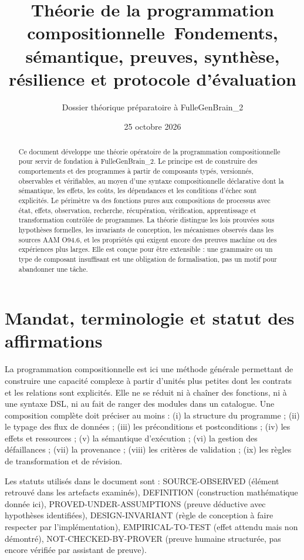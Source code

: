 \documentclass[11pt,a4paper]{article}
\title{Théorie de la programmation compositionnelle\
\large Fondements, sémantique, preuves, synthèse, résilience et protocole d'évaluation}
\author{Dossier théorique préparatoire à FulleGenBrain\_2}
\date{25 octobre 2026}
\newcommand{\kw}[1]{\textsf{#1}}
\theoremstyle{definition}
\theoremstyle{plain}
\theoremstyle{remark}
\begin{document}
\maketitle
\begin{abstract}
Ce document développe une théorie opératoire de la programmation compositionnelle pour servir de fondation à FulleGenBrain\_2. Le principe est de construire des comportements et des programmes à partir de composants typés, versionnés, observables et vérifiables, au moyen d'une syntaxe compositionnelle déclarative dont la sémantique, les effets, les coûts, les dépendances et les conditions d'échec sont explicités. Le périmètre va des fonctions pures aux compositions de processus avec état, effets, observation, recherche, récupération, vérification, apprentissage et transformation contrôlée de programmes. La théorie distingue les lois prouvées sous hypothèses formelles, les invariants de conception, les mécanismes observés dans les sources AAM O94.6, et les propriétés qui exigent encore des preuves machine ou des expériences plus larges. Elle est conçue pour être extensible : une grammaire ou un type de composant insuffisant est une obligation de formalisation, pas un motif pour abandonner une tâche.
\end{abstract}
\newpage\setcounter{tocdepth}{1}\tableofcontents\newpage

\section{Mandat, terminologie et statut des affirmations}
La programmation compositionnelle est ici une méthode générale permettant de construire une capacité complexe à partir d'unités plus petites dont les contrats et les relations sont explicités. Elle ne se réduit ni à chaîner des fonctions, ni à une syntaxe DSL, ni au fait de ranger des modules dans un catalogue. Une composition complète doit préciser au moins : (i) la structure du programme ; (ii) le typage des flux de données ; (iii) les préconditions et postconditions ; (iv) les effets et ressources ; (v) la sémantique d'exécution ; (vi) la gestion des défaillances ; (vii) la provenance ; (viii) les critères de validation ; (ix) les règles de transformation et de révision.

Les statuts utilisés dans le document sont : \kw{SOURCE-OBSERVED} (élément retrouvé dans les artefacts examinés), \kw{DEFINITION} (construction mathématique donnée ici), \kw{PROVED-UNDER-ASSUMPTIONS} (preuve déductive avec hypothèses identifiées), \kw{DESIGN-INVARIANT} (règle de conception à faire respecter par l'implémentation), \kw{EMPIRICAL-TO-TEST} (effet attendu mais non démontré), \kw{NOT-CHECKED-BY-PROVER} (preuve humaine structurée, pas encore vérifiée par assistant de preuve).
\end{document}
